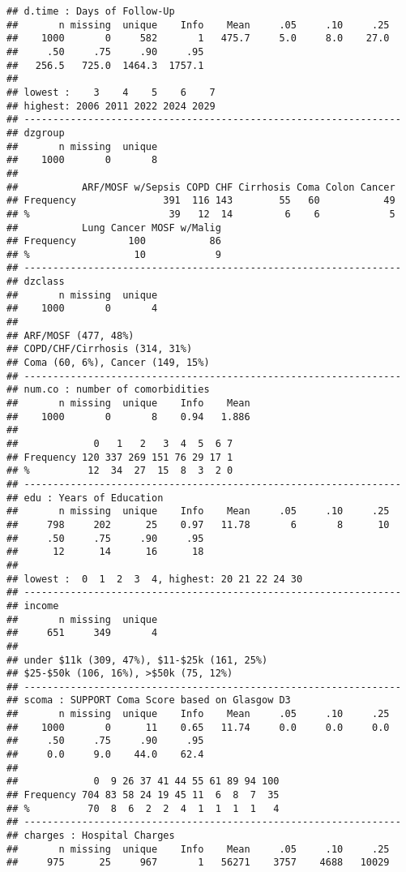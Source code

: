 \documentclass[headinclude=true, headsepline=true, DIV14]{scrartcl}\usepackage[]{graphicx}\usepackage[]{color}
\makeatletter
\newenvironment{kframe}{%
 \def\at@end@of@kframe{}%
 \ifinner\ifhmode%
  \def\at@end@of@kframe{\end{minipage}}%
  \begin{minipage}{\columnwidth}%
 \fi\fi%
 \def\FrameCommand##1{\hskip\@totalleftmargin \hskip-\fboxsep
 \colorbox{shadecolor}{##1}\hskip-\fboxsep
     \hskip-\linewidth \hskip-\@totalleftmargin \hskip\columnwidth}%
 \MakeFramed {\advance\hsize-\width
   \@totalleftmargin\z@ \linewidth\hsize
   \@setminipage}}%
 {\par\unskip\endMakeFramed%
 \at@end@of@kframe}
\newenvironment{knitrout}{}{} %
\makeatother
\begin{document}
\begin{knitrout}
\begin{kframe}
\begin{verbatim}
## d.time : Days of Follow-Up 
##       n missing  unique    Info    Mean     .05     .10     .25 
##    1000       0     582       1   475.7     5.0     8.0    27.0 
##     .50     .75     .90     .95 
##   256.5   725.0  1464.3  1757.1 
## 
## lowest :    3    4    5    6    7
## highest: 2006 2011 2022 2024 2029 
## -----------------------------------------------------------------
## dzgroup 
##       n missing  unique 
##    1000       0       8 
## 
##           ARF/MOSF w/Sepsis COPD CHF Cirrhosis Coma Colon Cancer
## Frequency               391  116 143        55   60           49
## %                        39   12  14         6    6            5
##           Lung Cancer MOSF w/Malig
## Frequency         100           86
## %                  10            9
## -----------------------------------------------------------------
## dzclass 
##       n missing  unique 
##    1000       0       4 
## 
## ARF/MOSF (477, 48%) 
## COPD/CHF/Cirrhosis (314, 31%) 
## Coma (60, 6%), Cancer (149, 15%) 
## -----------------------------------------------------------------
## num.co : number of comorbidities 
##       n missing  unique    Info    Mean 
##    1000       0       8    0.94   1.886 
## 
##             0   1   2   3  4  5  6 7
## Frequency 120 337 269 151 76 29 17 1
## %          12  34  27  15  8  3  2 0
## -----------------------------------------------------------------
## edu : Years of Education 
##       n missing  unique    Info    Mean     .05     .10     .25 
##     798     202      25    0.97   11.78       6       8      10 
##     .50     .75     .90     .95 
##      12      14      16      18 
## 
## lowest :  0  1  2  3  4, highest: 20 21 22 24 30 
## -----------------------------------------------------------------
## income 
##       n missing  unique 
##     651     349       4 
## 
## under $11k (309, 47%), $11-$25k (161, 25%) 
## $25-$50k (106, 16%), >$50k (75, 12%) 
## -----------------------------------------------------------------
## scoma : SUPPORT Coma Score based on Glasgow D3 
##       n missing  unique    Info    Mean     .05     .10     .25 
##    1000       0      11    0.65   11.74     0.0     0.0     0.0 
##     .50     .75     .90     .95 
##     0.0     9.0    44.0    62.4 
## 
##             0  9 26 37 41 44 55 61 89 94 100
## Frequency 704 83 58 24 19 45 11  6  8  7  35
## %          70  8  6  2  2  4  1  1  1  1   4
## -----------------------------------------------------------------
## charges : Hospital Charges 
##       n missing  unique    Info    Mean     .05     .10     .25 
##     975      25     967       1   56271    3757    4688   10029 

\end{verbatim}
\end{kframe}
\end{knitrout}
\end{document}
